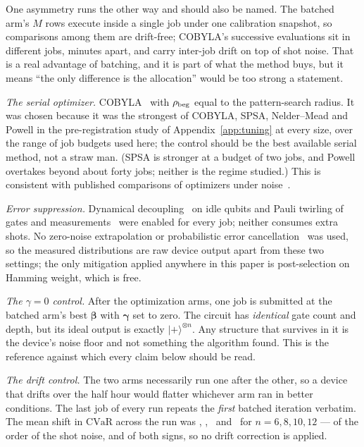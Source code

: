 \documentclass[aps,prx,preprint,superscriptaddress,nofootinbib,longbibliography]{revtex4-2}
\newcommand{\CVaR}{\mathrm{CVaR}}
\providecommand{\ket}[1]{|#1\rangle}
\begin{document}
One asymmetry runs the other way and should also be named. The batched arm's $M$ rows execute
inside a single job under one calibration snapshot, so comparisons among them are drift-free;
COBYLA's successive evaluations sit in different jobs, minutes apart, and carry inter-job drift
on top of shot noise. That is a real advantage of batching, and it is part of what the method
buys, but it means ``the only difference is the allocation'' would be too strong a statement.

\emph{The serial optimizer.} COBYLA~\cite{powell1994cobyla} with $\rho_{\rm beg}$ equal to the
pattern-search radius. It was chosen because it was the strongest of COBYLA, SPSA, Nelder--Mead
and Powell in the pre-registration study of Appendix~\ref{app:tuning} at every size, over the
range of job budgets used here; the control should be the best available serial method, not a
straw man. (SPSA is stronger at a budget of two jobs, and Powell overtakes beyond about forty
jobs; neither is the regime studied.) This is
consistent with published comparisons of optimizers under
noise~\cite{lavrijsen2020optimizers,bonetmonroig2023comparison}.

\emph{Error suppression.} Dynamical decoupling~\cite{viola1999decoupling,ezzell2023dd} on
idle qubits and Pauli twirling of gates and measurements~\cite{wallman2016twirling} were
enabled for every job; neither consumes extra shots. No zero-noise extrapolation or probabilistic error
cancellation~\cite{temme2017mitigation} was used, so the measured distributions are raw device
output apart from these two settings; the only mitigation applied anywhere in this paper is
post-selection on Hamming weight, which is free.

\emph{The $\gamma=0$ control.} After the optimization arms, one job is submitted at the
batched arm's best $\boldsymbol\beta$ with $\boldsymbol\gamma$ set to zero. The circuit has
\emph{identical} gate count and depth, but its ideal output is exactly $\ket{+}^{\otimes n}$.
Any structure that survives in it is the device's noise floor and not something the algorithm
found. This is the reference against which every claim below should be read.

\emph{The drift control.} The two arms necessarily run one after the other, so a device that
drifts over the half hour would flatter whichever arm ran in better conditions. The last job
of every run repeats the \emph{first} batched iteration verbatim. The mean shift in $\CVaR$
across the run was \driftsix, \drifteight, \driftten\ and \drifttwelve\ for
$n=6,8,10,12$ --- of the order of the shot noise, and of both signs, so no drift correction
is applied.
\end{document}
